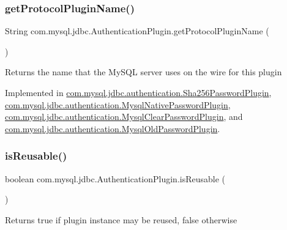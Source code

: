 \subsubsection{\texorpdfstring{get\+Protocol\+Plugin\+Name()}{getProtocolPluginName()}}
{\footnotesize\ttfamily String com.\+mysql.\+jdbc.\+Authentication\+Plugin.\+get\+Protocol\+Plugin\+Name (\begin{DoxyParamCaption}{ }\end{DoxyParamCaption})}

Returns the name that the My\+S\+QL server uses on the wire for this plugin 

Implemented in \mbox{\hyperlink{classcom_1_1mysql_1_1jdbc_1_1authentication_1_1_sha256_password_plugin_a038ab59e32db24d7aba880be1bdf3286}{com.\+mysql.\+jdbc.\+authentication.\+Sha256\+Password\+Plugin}}, \mbox{\hyperlink{classcom_1_1mysql_1_1jdbc_1_1authentication_1_1_mysql_native_password_plugin_a864fdbd1fc6282bfdf04805cd059d46b}{com.\+mysql.\+jdbc.\+authentication.\+Mysql\+Native\+Password\+Plugin}}, \mbox{\hyperlink{classcom_1_1mysql_1_1jdbc_1_1authentication_1_1_mysql_clear_password_plugin_af847af9fb6871a67066bdce231fb024e}{com.\+mysql.\+jdbc.\+authentication.\+Mysql\+Clear\+Password\+Plugin}}, and \mbox{\hyperlink{classcom_1_1mysql_1_1jdbc_1_1authentication_1_1_mysql_old_password_plugin_a06ca40d8d34e31a0c20b7c22b7ceec78}{com.\+mysql.\+jdbc.\+authentication.\+Mysql\+Old\+Password\+Plugin}}.

\mbox{\label{interfacecom_1_1mysql_1_1jdbc_1_1_authentication_plugin_abf6de7affb05904b1dba5517a17421d1}} 
\subsubsection{\texorpdfstring{is\+Reusable()}{isReusable()}}
{\footnotesize\ttfamily boolean com.\+mysql.\+jdbc.\+Authentication\+Plugin.\+is\+Reusable (\begin{DoxyParamCaption}{ }\end{DoxyParamCaption})}

\begin{DoxyReturn}{Returns}
true if plugin instance may be reused, false otherwise 
\end{DoxyReturn}


